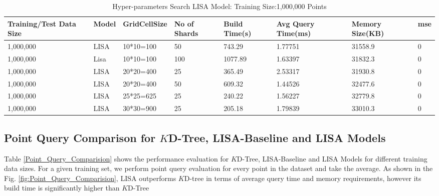 \begin{table}
	\centering
\centering
	\begin{tabular}{||p{}<{\centering}|p{}<{\centering}|p{}<{\centering}| p{}<{\centering}|p{}<{\centering}|p{}<{\centering}|p{}<{\centering}|p{}<{\centering}||}
		\hline
		Training/Test Data Size& Model & GridCellSize & No of Shards& Build Time(s) & Avg Query Time(ms) & Memory Size(KB)&mse\\ [0.5ex] 
		\hline
		\hline
		1,000,000& LISA& 10*10=100 & 50&743.29&1.77751 & 31558.9&0\\
		\hline
		1,000,000& Lisa& 10*10=100 & 100& 1077.89& 1.63397 & 31832.3&0\\
		\hline
		1,000,000& LISA& 20*20=400 & 25& 365.49& 2.53317 & 31930.8&0\\
		\hline
		1,000,000& LISA& 20*20=400 & 50& 609.32& 1.44526 & 32477.6&0\\
		\hline
		1,000,000& LISA& 25*25=625 & 25& 240.22& 1.56227& 32779.8&0\\
		\hline
		1,000,000& LISA& 30*30=900 & 25& 205.18& 1.79839 & 33010.3&0\\
		\hline
		\hline
	\end{tabular}
    \caption{Hyper-parameters Search LISA Model: Training Size:1,000,000 Points}
	\label{small_lognormal_lisa_1000000}
\end{table}

\subsection{Point Query Comparison for $K$D-Tree, LISA-Baseline and LISA Models }
Table \ref{Point_Query_Comparision} shows the performance evaluation for $K$D-Tree, LISA-Baseline and LISA Models for different training data sizes. For a given training set, we perform point query evaluation for every point in the dataset and take the average. As shown in the Fig. \ref{fig:Point_Query_Comparision}, LISA outperforms $K$D-tree in terms of average query time and memory requirements, however its build time is significantly higher than $K$D-Tree 

